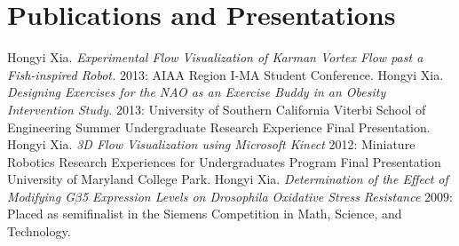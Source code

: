 \documentclass[10pt,letterpaper,sans]{moderncv}        %
\begin{document}

\renewcommand{\refname}{Presentations}
\section{Publications and Presentations}
% 
\begin{thebibliography}{1}
 Hongyi Xia. {\em Experimental Flow Visualization of Karman Vortex Flow past a Fish-inspired Robot.}  2013: AIAA Region I-MA Student Conference.
 Hongyi Xia. {\em Designing Exercises for the NAO as an Exercise Buddy in an Obesity Intervention Study.} 2013: University of Southern California Viterbi School of Engineering Summer Undergraduate Research Experience Final Presentation.
  Hongyi Xia. {\em 3D Flow Visualization using Microsoft Kinect} 2012:
Miniature Robotics Research Experiences for Undergraduates Program Final Presentation University of Maryland College Park.
 Hongyi Xia. {\em Determination of the Effect of Modifying G$\beta$5 Expression Levels on Drosophila Oxidative Stress Resistance} 2009: Placed as semifinalist in the Siemens Competition in Math, Science, and Technology.
\end{thebibliography}



\end{document}
